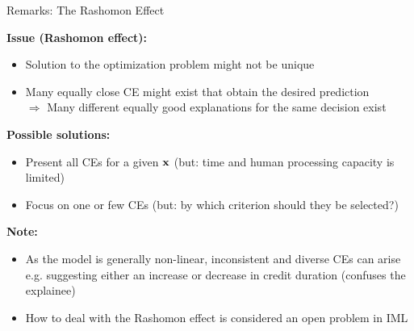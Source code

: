 \documentclass[11pt,compress,t,notes=noshow, aspectratio=169, xcolor=table, usenames,dvipsnames]{beamer}
\begin{document}
\begin{frame}{Remarks: The Rashomon Effect}

\textbf{Issue (\textbf{Rashomon effect}):}
\begin{itemize}
    \item Solution to the optimization problem might not be unique
    \item Many equally close CE might exist that obtain the desired prediction\\
    $\Rightarrow$ Many different equally good explanations for the same decision exist
\end{itemize}

\lz\pause

\textbf{Possible solutions:}
	\begin{itemize}
	\item Present all CEs for a given $\xv$ (but: time and human processing capacity is limited)
		\item Focus on one or few CEs (but: by which criterion should they be selected?)
	\end{itemize}
	
\lz\pause

\textbf{Note:}
	\begin{itemize}
        \item As the model is generally non-linear, inconsistent and diverse CEs can arise\\
        e.g. suggesting either an increase or decrease in credit duration (confuses the explainee)
		\item How to deal with the Rashomon effect is considered an open problem in IML
	\end{itemize}
\end{frame}
\end{document}
